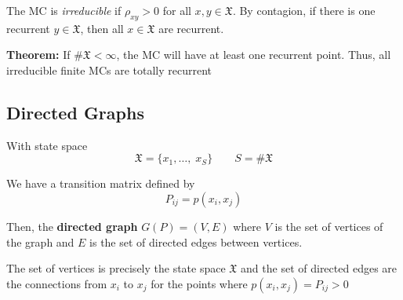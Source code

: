 \documentclass[12pt]{article}
\newcommand{\mfX}{\mathfrak{X}}
\begin{document}
The MC is \emph{irreducible} if $\rho_{xy} > 0$ for all $x, y \in \mfX$. By contagion, if there is one recurrent $y \in \mfX$, then all $x \in \mfX$ are recurrent. 

\textbf{Theorem:} If $\#\mfX < \infty$, the MC will have at least one recurrent point. Thus, all irreducible finite MCs are totally recurrent

\subsection{Directed Graphs}
With state space
\[\mfX = \{x_1, \dots,\; x_S\} \qquad S = \#\mfX\]

We have a transition matrix defined by 
\[P_{ij} = p(x_i, x_j)\]

Then, the \textbf{directed graph} $G(P) = (V, E)$ where $V$ is the set of vertices of the graph and $E$ is the set of directed edges between vertices.

The set of vertices is precisely the state space $\mfX$ and the set of directed edges are the connections from $x_i$ to $x_j$ for the points where $p(x_i, x_j) = P_{ij} > 0$
\end{document}
